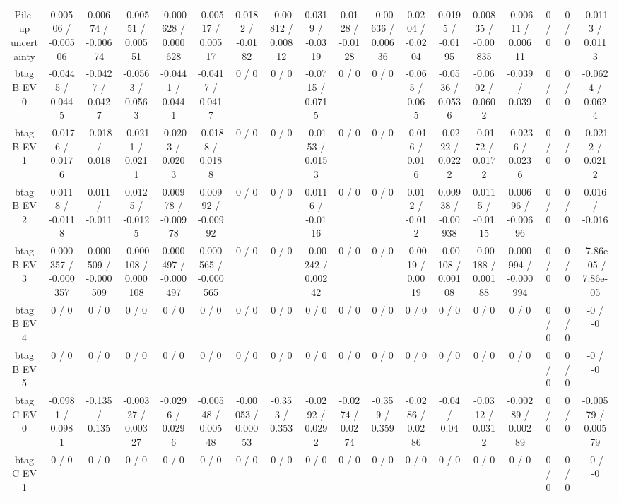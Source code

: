 \documentclass[10pt]{article}
\begin{document}
\begin{table}[htbp]
\begin{center}
\begin{tabular}{|c|c|c|c|c|c|c|c|c|c|c|c|c|c|c|c|c|c|}
  Pile-up uncertainty & 0.00506 / -0.00506 & 0.00674 / -0.00674 & -0.00551 / 0.00551 & -0.000628 / 0.000628 & -0.00517 / 0.00517 & 0.0182 / -0.0182 & -0.00812 / 0.00812 & 0.0319 / -0.0319 & 0.0128 / -0.0128 & -0.00636 / 0.00636 & 0.0204 / -0.0204 & 0.0195 / -0.0195 & 0.00835 / -0.00835 & -0.00611 / 0.00611 & 0 / 0 & 0 / 0 & -0.0113 / 0.0113 \\ 
  btag B EV 0 & -0.0445 / 0.0445 & -0.0427 / 0.0427 & -0.0563 / 0.0563 & -0.0441 / 0.0441 & -0.0417 / 0.0417 & 0 / 0 & 0 / 0 & -0.0715 / 0.0715 & 0 / 0 & 0 / 0 & -0.065 / 0.065 & -0.0536 / 0.0536 & -0.0602 / 0.0602 & -0.039 / 0.039 & 0 / 0 & 0 / 0 & -0.0624 / 0.0624 \\ 
  btag B EV 1 & -0.0176 / 0.0176 & -0.018 / 0.018 & -0.0211 / 0.0211 & -0.0203 / 0.0203 & -0.0188 / 0.0188 & 0 / 0 & 0 / 0 & -0.0153 / 0.0153 & 0 / 0 & 0 / 0 & -0.016 / 0.016 & -0.0222 / 0.0222 & -0.0172 / 0.0172 & -0.0236 / 0.0236 & 0 / 0 & 0 / 0 & -0.0212 / 0.0212 \\ 
  btag B EV 2 & 0.0118 / -0.0118 & 0.011 / -0.011 & 0.0125 / -0.0125 & 0.00978 / -0.00978 & 0.00992 / -0.00992 & 0 / 0 & 0 / 0 & 0.0116 / -0.0116 & 0 / 0 & 0 / 0 & 0.012 / -0.012 & 0.00938 / -0.00938 & 0.0115 / -0.0115 & 0.00696 / -0.00696 & 0 / 0 & 0 / 0 & 0.016 / -0.016 \\ 
  btag B EV 3 & 0.000357 / -0.000357 & 0.000509 / -0.000509 & -0.000108 / 0.000108 & 0.000497 / -0.000497 & 0.000565 / -0.000565 & 0 / 0 & 0 / 0 & -0.00242 / 0.00242 & 0 / 0 & 0 / 0 & -0.0019 / 0.0019 & -0.00108 / 0.00108 & -0.00188 / 0.00188 & 0.000994 / -0.000994 & 0 / 0 & 0 / 0 & -7.86e-05 / 7.86e-05 \\ 
  btag B EV 4 & 0 / 0 & 0 / 0 & 0 / 0 & 0 / 0 & 0 / 0 & 0 / 0 & 0 / 0 & 0 / 0 & 0 / 0 & 0 / 0 & 0 / 0 & 0 / 0 & 0 / 0 & 0 / 0 & 0 / 0 & 0 / 0 & -0 / -0 \\ 
  btag B EV 5 & 0 / 0 & 0 / 0 & 0 / 0 & 0 / 0 & 0 / 0 & 0 / 0 & 0 / 0 & 0 / 0 & 0 / 0 & 0 / 0 & 0 / 0 & 0 / 0 & 0 / 0 & 0 / 0 & 0 / 0 & 0 / 0 & -0 / -0 \\ 
  btag C EV 0 & -0.0981 / 0.0981 & -0.135 / 0.135 & -0.00327 / 0.00327 & -0.0296 / 0.0296 & -0.00548 / 0.00548 & -0.00053 / 0.00053 & -0.353 / 0.353 & -0.0292 / 0.0292 & -0.0274 / 0.0274 & -0.359 / 0.359 & -0.0286 / 0.0286 & -0.04 / 0.04 & -0.0312 / 0.0312 & -0.00289 / 0.00289 & 0 / 0 & 0 / 0 & -0.00579 / 0.00579 \\ 
  btag C EV 1 & 0 / 0 & 0 / 0 & 0 / 0 & 0 / 0 & 0 / 0 & 0 / 0 & 0 / 0 & 0 / 0 & 0 / 0 & 0 / 0 & 0 / 0 & 0 / 0 & 0 / 0 & 0 / 0 & 0 / 0 & 0 / 0 & -0 / -0 \\ 

\end{tabular}
\end{center}
\end{table}
\end{document}
